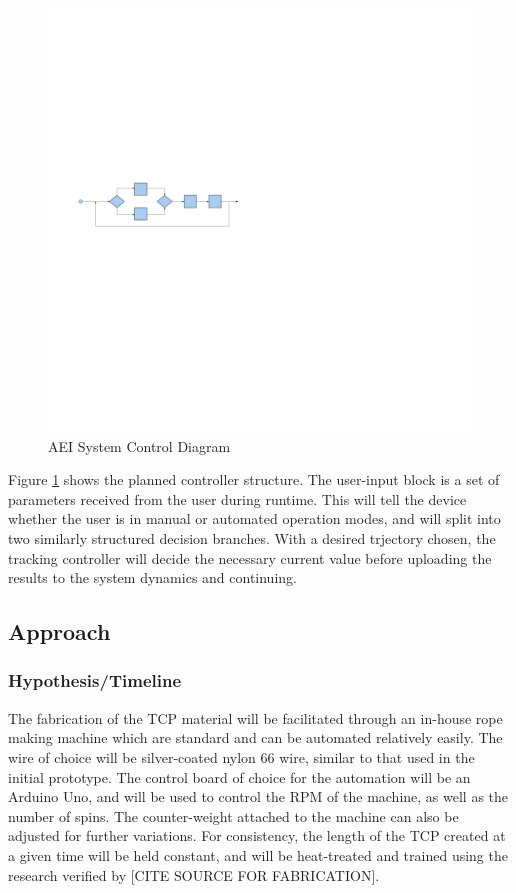 \begin{figure}[ht]
	\centering
	\includegraphics[scale=0.30]{control_diagram}
	\caption{AEI System Control Diagram}
	\label{fig:control_diagram}
\end{figure}

Figure \ref{fig:control_diagram} shows the planned controller structure. The user-input block is a set of parameters received from the user during runtime. This will tell the device whether the user is in manual or automated operation modes, and will split into two similarly structured decision branches. With a desired trjectory chosen, the tracking controller will decide the necessary current value before uploading the results to the system dynamics and continuing.

\subsection{Approach}

	\subsubsection{Hypothesis/Timeline}

The fabrication of the TCP material will be facilitated through an in-house rope making machine which are standard and can be automated relatively easily. The wire of choice will be silver-coated nylon 66 wire, similar to that used in the initial prototype. The control board of choice for the automation will be an Arduino Uno, and will be used to control the RPM of the machine, as well as the number of spins. The counter-weight attached to the machine can also be adjusted for further variations. For consistency, the length of the TCP created at a given time will be held constant, and will be heat-treated and trained using the research verified by [CITE SOURCE FOR FABRICATION].


